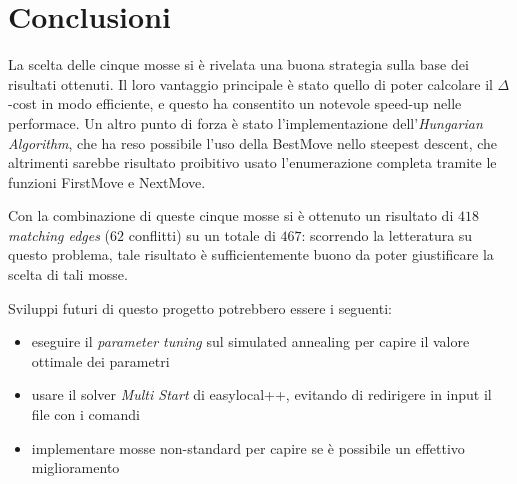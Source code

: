 
\section{Conclusioni} %
\label{sec:conclusioni}
	
    La scelta delle cinque mosse si è rivelata una buona strategia sulla base dei risultati ottenuti. Il loro vantaggio principale è stato quello di poter calcolare il $\Delta$-cost in modo efficiente, e questo ha consentito un notevole speed-up nelle performace. Un altro punto di forza è stato l'implementazione dell'\textit{Hungarian Algorithm}, che ha reso possibile l'uso della BestMove nello steepest descent, che altrimenti sarebbe risultato proibitivo usato l'enumerazione completa tramite le funzioni FirstMove e NextMove.
    
    Con la combinazione di queste cinque mosse si è ottenuto un risultato di $418$ \textit{matching edges} ($62$ conflitti) su un totale di $467$: scorrendo la letteratura su questo problema, tale risultato è sufficientemente buono da poter giustificare la scelta di tali mosse.

    Sviluppi futuri di questo progetto potrebbero essere i seguenti:
    \begin{itemize}
    	\item eseguire il \textit{parameter tuning} sul simulated annealing per capire il valore ottimale dei parametri
    	\item usare il solver \textit{Multi Start} di easylocal++, evitando di redirigere in input il file con i comandi
    	\item implementare mosse non-standard per capire se è possibile un effettivo miglioramento
    \end{itemize}


